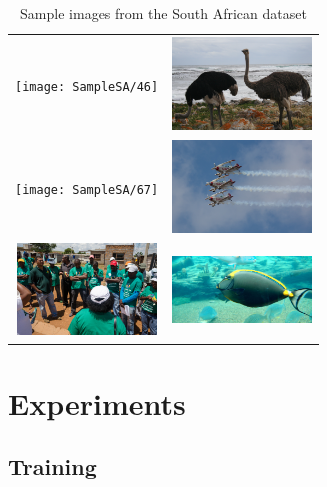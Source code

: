 \documentclass[conference]{IEEEtran}
\begin{document}
\begin{table}[h!]
\centering
\begin{tabular}{cc}
\texttt{[image: SampleSA/46]} & \includegraphics[width=3.7cm]{SampleSA/61}\\
\texttt{[image: SampleSA/67]} & \includegraphics[width=3.7cm]{SampleSA/69}\\
\includegraphics[width=3.7cm]{SampleSA/106} & \includegraphics[width=3.7cm]{SampleSA/127}\\

\end{tabular}
\caption{Sample images from the South African dataset}
\label{fig:samplesa}
\end{table}

\section{Experiments}

%
%
%
%
%

\subsection{Training}
\end{document}
